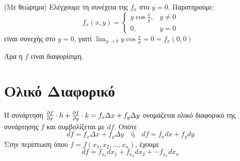 \begin{examples}
\begin{enumerate}
\begin{solution}{(Με θεώρημα)}
                        Ελέγχουμε τη συνέχεια της $ f_{x} $ στο $ y=0 $. Παρατηρούμε:
                        \[
                            f_{x}(x,y) = \begin{cases} y \cos{\frac{x}{y}}, & y \neq 0 \\ 0, & y=0 \end{cases}  
                         \] 
                         είναι συνεχής στο $ y=0 $, γιατί $ \lim_{y \to 0} y \cos{\frac{x}{y}
                         } = 0 = f_{x}(0,0) $
                         
                         Άρα η $f$ είναι διαφορίσιμη.
                    \end{solution}
            \end{enumerate}
        \end{examples}

        \section{Ολικό Διαφορικό}

        \begin{dfn}
        \item {}
            Η συνάρτηση $ \pdv{f}{x}\cdot h + \pdv{f}{y} \cdot k = f_{x} \Delta x 
            + f_{y} \Delta y $ ονομάζεται ολικό διαφορικό της συνάρτησης $f$ και συμβολίζεται με $
            df $. Οπότε 
            \[
                df = f_{x} \Delta x + f_{y} \Delta y \quad \text{ή} \quad df = f_{x}dx + f_{y}dy 
             \] 
             Στην περίπτωση όπου $ f= f(x_{1}, x_{2}, \ldots, x_{n}) $, έχουμε
             \[
                 df = f_{x_{1}}d{x_{1}} + f_{x_{2}}d{x_{2}} + \cdots f_{x_{n}} dx_{n}
              \]

        \end{dfn}

     
